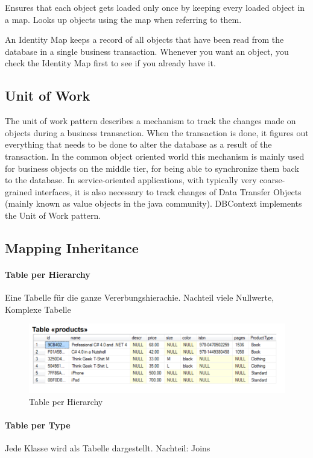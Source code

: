 \documentclass[
a4paper,
oneside,
10pt,
fleqn,
headsepline,
toc=listofnumbered, 
bibliography=totocnumbered]{scrartcl}
\begin{document}
Ensures that each object gets loaded only once by keeping every loaded object in a map. Looks up objects using the map when referring to them.

An Identity Map keeps a record of all objects that have been read from the database in a single business transaction. Whenever you want an object, you check the Identity Map first to see if you already have it.

\subsection{Unit of Work}

The unit of work pattern describes a mechanism to track the changes made on objects during a business transaction. When the transaction is done, it figures out everything that needs to be done to alter the database as a result of the transaction. In the common object oriented world this mechanism is mainly used for business objects on the middle tier, for being able to synchronize them back to the database. In service-oriented applications, with typically very coarse-grained interfaces, it is also necessary to track changes of Data Transfer Objects (mainly known as value objects in the java community). DBContext implements the Unit of Work pattern.

\subsection{Mapping Inheritance}
\paragraph{Table per Hierarchy}
Eine Tabelle für die ganze Vererbungshierachie. Nachteil viele Nullwerte, Komplexe Tabelle

\begin{figure}[h!]
\centering
\includegraphics[width=0.8\linewidth]{images/tablePerHierarchy}
\caption{Table per Hierarchy}
\end{figure}

\paragraph{Table per Type}
Jede Klasse wird als Tabelle dargestellt. Nachteil: Joins
\end{document}
